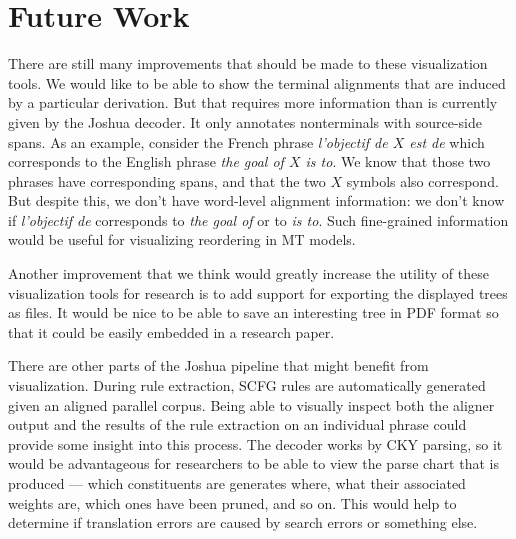 \documentclass[nologo]{pbml}
\begin{document}
%



\section{Future Work}

There are still many improvements that should be made to these visualization
tools. %
We would like to be able to show the terminal alignments
that are induced by a particular derivation. But that requires more information
than is currently given by the Joshua decoder.
It only annotates nonterminals with
source-side spans.
As an example, consider the French phrase {\it l'objectif de $X$ est de}
 which corresponds to the English phrase {\it the goal of $X$ is to}. We know
 that those two phrases have corresponding spans, and that the two $X$ symbols
 also correspond. But despite this, we don't have word-level alignment
information: we don't know if {\it l'objectif de} corresponds to {\it the goal
of} or to {\it is to}. Such fine-grained information would be useful for
visualizing reordering in MT models.

Another improvement that we think would greatly increase the utility of these
visualization tools for research is to add support for exporting the displayed
trees as files. It would be nice to be able to  save an interesting tree in PDF format so that it could be easily embedded in a research paper.

There are other parts of the Joshua pipeline that might benefit
from visualization. During rule extraction, SCFG rules are automatically
generated given an aligned parallel corpus. Being able to visually inspect
both the aligner output and the results of the rule extraction on an individual
phrase could provide some insight into this process.
The decoder works by CKY
parsing, so it would be advantageous for researchers to be able to view the
parse chart that is produced --- which constituents are generates where, what
their associated weights are, which ones have been pruned, and so on. This
 would help to determine if translation errors are caused by search errors
 or something else.
\end{document}

